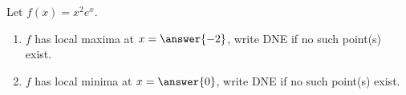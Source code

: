 \documentclass{ximera}
\author{Gregory Hartman \and Matthew Carr}
\begin{document}
\begin{exercise}






Let $f(x)=x^{2}e^x$.
\begin{enumerate}
\item		$f$ has local maxima at $x=\answer{-2}$, write DNE if no such point(s) exist.
\item		$f$ has local minima at $x=\answer{0}$, write DNE if no such point(s) exist.
\end{enumerate}

\end{exercise}
\end{document}
